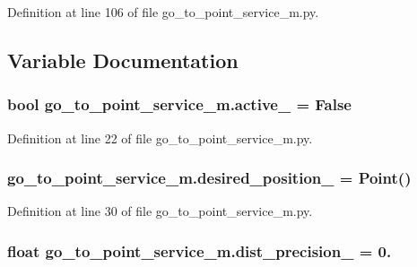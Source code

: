 Definition at line 106 of file go\+\_\+to\+\_\+point\+\_\+service\+\_\+m.\+py.



\subsection{Variable Documentation}
\subsubsection[{\texorpdfstring{active\+\_\+}{active_}}]{\setlength{\rightskip}{0pt plus 5cm}bool go\+\_\+to\+\_\+point\+\_\+service\+\_\+m.\+active\+\_\+ = False}\hypertarget{namespacego__to__point__service__m_a0a0a9847f2d5f0059f48709cba4df15c}{}\label{namespacego__to__point__service__m_a0a0a9847f2d5f0059f48709cba4df15c}


Definition at line 22 of file go\+\_\+to\+\_\+point\+\_\+service\+\_\+m.\+py.

\subsubsection[{\texorpdfstring{desired\+\_\+position\+\_\+}{desired_position_}}]{\setlength{\rightskip}{0pt plus 5cm}go\+\_\+to\+\_\+point\+\_\+service\+\_\+m.\+desired\+\_\+position\+\_\+ = Point()}\hypertarget{namespacego__to__point__service__m_a5e4a4244e883c27be9ed897ea5460cc0}{}\label{namespacego__to__point__service__m_a5e4a4244e883c27be9ed897ea5460cc0}


Definition at line 30 of file go\+\_\+to\+\_\+point\+\_\+service\+\_\+m.\+py.

\subsubsection[{\texorpdfstring{dist\+\_\+precision\+\_\+}{dist_precision_}}]{\setlength{\rightskip}{0pt plus 5cm}float go\+\_\+to\+\_\+point\+\_\+service\+\_\+m.\+dist\+\_\+precision\+\_\+ = 0.}\hypertarget{namespacego__to__point__service__m_a15a85217148ccc92490d2ec8366dfbd4}{}\label{namespacego__to__point__service__m_a15a85217148ccc92490d2ec8366dfbd4}


